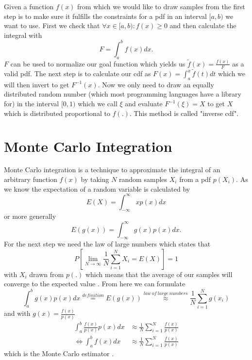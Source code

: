 Given a function $ f(x) $ from which we would like to draw samples from the first step is to make sure
it fulfills the constraints for a pdf in an interval $ [a, b) $ we want to use.
First we check that $ \forall x \in [a, b): f(x) \geq 0 $ and then calculate the integral with
\begin{equation}
\label{eq:integral_fx}
    F = \int_{a}^b f(x) dx.
\end{equation}
$ F $ can be used to normalize our goal function which yields us $ \tilde{f}(x) = \frac{f(x)}{F} $ as a valid pdf.
The next step is to calculate our cdf as $ F(x) = \int_{a}^x \tilde{f}(t) dt $ which we will then invert to get $ F^{-1}(x) $.
Now we only need to draw an equally distributed random number (which most programming languages have a library for) in the interval $ [0, 1) $
which we call $ \xi $ and evaluate $ F^{-1}(\xi) = X $ to get $ X $ which is distributed proportional to $ f(.) $.
This method is called "inverse cdf". \cite{pris}


\section{Monte Carlo Integration}
\label{sec:monte_carlo}
Monte Carlo integration is a technique to approximate the integral of an arbitrary function $ f(x) $
by taking $ N $ random samples $ X_i $ from a pdf $ p(X_i) $.
As we know the expectation of a random variable is calculated by $$ E(X) = \int_{-\infty}^\infty x p(x) dx $$
or more generally $$ E(g(x)) = \int_{-\infty}^\infty g(x) p(x) dx. $$
For the next step we need the law of large numbers which states that $$ P\left[ \lim_{N\to\infty} \frac{1}{N} \sum_{i = 1}^N X_i = E(X) \right] = 1 $$
with $ X_i $ drawn from $ p(.) $ which means that the average of our samples will converge to the expected value \cite[Chapter~2.4.1]{veach-thesis}.
From here we can formulate
\begin{equation*}
    \int_{a}^b g(x) p(x) dx \stackrel{definition}{=} E(g(x))
    \stackrel{law~of~large~numbers}{\approx} \frac{1}{N} \sum_{i = 1}^N g(x_i)
\end{equation*}
and with $ g(x) = \frac{f(x)}{p(x)} $
\begin{equation}
\begin{aligned}
    \label{eq:monte_carlo_integral}
    \int_{a}^b \frac{f(x)}{p(x)} p(x) dx &\approx \frac{1}{N} \sum_{i = 1}^N \frac{f(x)}{p(x)} \\
    \Leftrightarrow \int_{a}^b f(x) dx &\approx \frac{1}{N} \sum_{i = 1}^N \frac{f(x)}{p(x)}
\end{aligned}
\end{equation}
which is the Monte Carlo estimator \cite{pris}.


